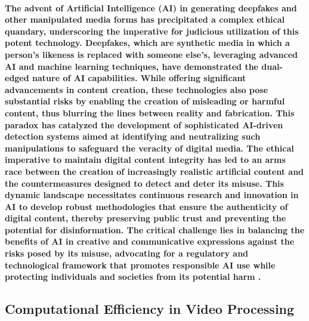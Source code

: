 \documentclass[11pt,a4paper,oneside]{report}
\begin{document}
\paragraph{The advent of Artificial Intelligence (AI) in generating deepfakes and other manipulated media forms has precipitated a complex ethical quandary, underscoring the imperative for judicious utilization of this potent technology. Deepfakes, which are synthetic media in which a person's likeness is replaced with someone else's, leveraging advanced AI and machine learning techniques, have demonstrated the dual-edged nature of AI capabilities. While offering significant advancements in content creation, these technologies also pose substantial risks by enabling the creation of misleading or harmful content, thus blurring the lines between reality and fabrication. This paradox has catalyzed the development of sophisticated AI-driven detection systems aimed at identifying and neutralizing such manipulations to safeguard the veracity of digital media. The ethical imperative to maintain digital content integrity has led to an arms race between the creation of increasingly realistic artificial content and the countermeasures designed to detect and deter its misuse. This dynamic landscape necessitates continuous research and innovation in AI to develop robust methodologies that ensure the authenticity of digital content, thereby preserving public trust and preventing the potential for disinformation. The critical challenge lies in balancing the benefits of AI in creative and communicative expressions against the risks posed by its misuse, advocating for a regulatory and technological framework that promotes responsible AI use while protecting individuals and societies from its potential harm \cite{kasten2021layered}.}

\subsection{Computational Efficiency in Video Processing}
\end{document}
